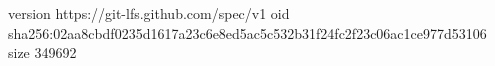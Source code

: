version https://git-lfs.github.com/spec/v1
oid sha256:02aa8cbdf0235d1617a23c6e8ed5ac5c532b31f24fc2f23c06ac1ce977d53106
size 349692
